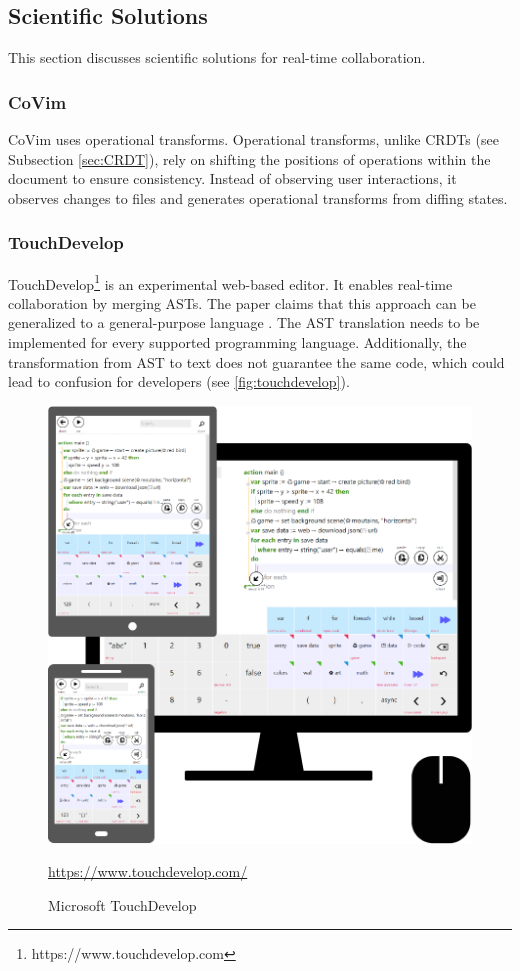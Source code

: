 \subsection{Scientific Solutions}

This section discusses scientific solutions for real-time collaboration.

\subsubsection{CoVim}
CoVim \cite{ChoNgSun:2017:CoVim:Incorporatingreal-timecollaborationcapabilitiesintocomprehensivetexteditors} uses operational transforms. Operational transforms, unlike CRDTs (see Subsection \ref{sec:CRDT}), rely on shifting the positions of operations within the document to ensure consistency. Instead of observing user interactions, it observes changes to files and generates operational transforms from diffing states.

\subsubsection{TouchDevelop}
TouchDevelop\footnote{https://www.touchdevelop.com} is an experimental web-based editor. It enables real-time collaboration by merging ASTs. The paper claims that this approach can be generalized to a general-purpose language \cite{ProtzenkoBurckhardtMoskalMcClurg:2015:Implementingreal-timecollaborationinTouchDevelopusingASTmerges}. The AST translation needs to be implemented for every supported programming language. Additionally, the transformation from AST to text does not guarantee the same code, which could lead to confusion for developers (see \autoref{fig:touchdevelop}).
\begin{figure}[hb]
    \centering
    \includegraphics[width=0.7\linewidth]{figures/screenshots/touchdevelop.png}
	\caption{Microsoft TouchDevelop }
	\href{https://www.touchdevelop.com/}{https://www.touchdevelop.com/}
    \label{fig:touchdevelop}
\end{figure}
